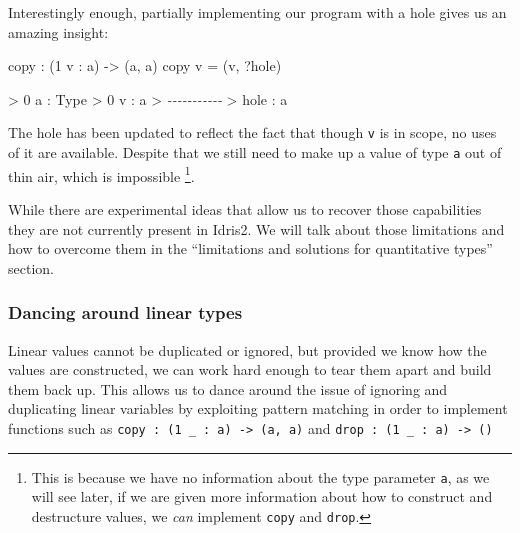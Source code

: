 \documentclass[
]{article}
\newenvironment{Shaded}{}{}
\newcommand{\CommentTok}[1]{\textcolor[rgb]{0.38,0.63,0.69}{\textit{#1}}}
\newcommand{\DataTypeTok}[1]{\textcolor[rgb]{0.56,0.13,0.00}{#1}}
\newcommand{\DecValTok}[1]{\textcolor[rgb]{0.25,0.63,0.44}{#1}}
\newcommand{\NormalTok}[1]{#1}
\newcommand{\OperatorTok}[1]{\textcolor[rgb]{0.40,0.40,0.40}{#1}}
\newcommand{\OtherTok}[1]{\textcolor[rgb]{0.00,0.44,0.13}{#1}}
\begin{document}
Interestingly enough, partially implementing our program with a hole
gives us an amazing insight:

\begin{Shaded}
\begin{Highlighting}[]
\NormalTok{copy }\OperatorTok{:}\NormalTok{ (}\DecValTok{1}\NormalTok{ v }\OperatorTok{:}\NormalTok{ a) }\OtherTok{{-}\textgreater{}}\NormalTok{ (a, a)}
\NormalTok{copy v }\OtherTok{=}\NormalTok{ (v, }\OperatorTok{?}\NormalTok{hole)}
\end{Highlighting}
\end{Shaded}

\begin{Shaded}
\begin{Highlighting}[]
\OperatorTok{\textgreater{}} \DecValTok{0}\NormalTok{ a }\OperatorTok{:} \DataTypeTok{Type}
\OperatorTok{\textgreater{}} \DecValTok{0}\NormalTok{ v }\OperatorTok{:}\NormalTok{ a}
\OperatorTok{\textgreater{}} \CommentTok{{-}{-}{-}{-}{-}{-}{-}{-}{-}{-}{-}}
\OperatorTok{\textgreater{}}\NormalTok{ hole }\OperatorTok{:}\NormalTok{ a}
\end{Highlighting}
\end{Shaded}

The hole has been updated to reflect the fact that though \texttt{v} is
in scope, no uses of it are available. Despite that we still need to
make up a value of type \texttt{a} out of thin air, which is impossible
\footnote{This is because we have no information about the type
  parameter \texttt{a}, as we will see later, if we are given more
  information about how to construct and destructure values, we
  \emph{can} implement \texttt{copy} and \texttt{drop}.}.

While there are experimental ideas that allow us to recover those
capabilities they are not currently present in Idris2. We will talk
about those limitations and how to overcome them in the ``limitations
and solutions for quantitative types'' section.

\hypertarget{dancing-around-linear-types}{%
\subsubsection{Dancing around linear
types}\label{dancing-around-linear-types}}

Linear values cannot be duplicated or ignored, but provided we know how
the values are constructed, we can work hard enough to tear them apart
and build them back up. This allows us to dance around the issue of
ignoring and duplicating linear variables by exploiting pattern matching
in order to implement functions such as
\texttt{copy\ :\ (1\ \_\ :\ a)\ \textasciigrave{}-\textgreater{}\ (a,\ a)}
and \texttt{drop\ :\ (1\ \_\ :\ a)\ -\textgreater{}\ ()}
\end{document}
